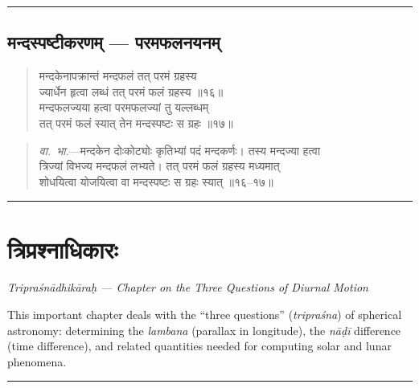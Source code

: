 \documentclass[11pt,a4paper]{article}
\newcommand{\longline}{\noindent\rule{\textwidth}{0.4pt}}
\newcommand{\dev}[1]{{\devanagarifont #1}}
\newenvironment{shloka}{%
  \begin{quote}
  \small
  \setlength{\leftmargin}{2em}
  \devanagarifont
}{\end{quote}}
\newenvironment{vyakhya}{%
  \begin{quote}
  \small
  \setlength{\leftmargin}{1em}
  \devanagarifont
}{\end{quote}}
\newcommand{\skt}[1]{{\devanagarifont #1}}
\begin{document}
\longline

\subsection{\dev{मन्दस्पष्टीकरणम् — परमफलनयनम्}}

\begin{shloka}
\skt{मन्दकेनापक्रान्तं मन्दफलं तत् परमं ग्रहस्य}\\[0.3em]
\skt{ज्यार्धेन हृत्वा लब्धं तत् परमं फलं ग्रहस्य ॥१६॥}\\[0.3em]
\skt{मन्दफलज्यया हत्वा परमफलज्यां तु यल्लब्धम्}\\[0.3em]
\skt{तत् परमं फलं स्यात् तेन मन्दस्पष्टः स ग्रहः ॥१७॥}
\end{shloka}

\begin{vyakhya}
\textit{वा.~भा.}—\skt{मन्दकेन दोःकोट्योः कृतिभ्यां पदं मन्दकर्णः। तस्य मन्दज्या हत्वा}\\
\skt{त्रिज्यां विभज्य मन्दफलं लभ्यते। तत् परमं फलं ग्रहस्य मध्यमात्}\\
\skt{शोधयित्वा योजयित्वा वा मन्दस्पष्टः स ग्रहः स्यात् ॥१६--१७॥}
\end{vyakhya}

\longline

\section{\dev{त्रिप्रश्नाधिकारः}}

\begin{center}
\textit{Tripraśnādhikāraḥ — Chapter on the Three Questions of Diurnal Motion}
\end{center}

This important chapter deals with the ``three questions'' (\textit{tripraśna}) of spherical astronomy: determining the \textit{lambana} (parallax in longitude), the \textit{nāḍī} difference (time difference), and related quantities needed for computing solar and lunar phenomena.

\longline
\end{document}
